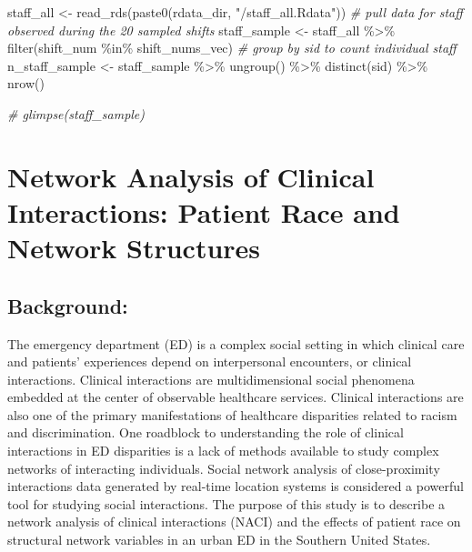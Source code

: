 \documentclass[
]{article}
\newenvironment{Shaded}{\begin{snugshade}}{\end{snugshade}}
\newcommand{\CommentTok}[1]{\textcolor[rgb]{0.56,0.35,0.01}{\textit{#1}}}
\newcommand{\FunctionTok}[1]{\textcolor[rgb]{0.00,0.00,0.00}{#1}}
\newcommand{\NormalTok}[1]{#1}
\newcommand{\OtherTok}[1]{\textcolor[rgb]{0.56,0.35,0.01}{#1}}
\newcommand{\SpecialCharTok}[1]{\textcolor[rgb]{0.00,0.00,0.00}{#1}}
\newcommand{\StringTok}[1]{\textcolor[rgb]{0.31,0.60,0.02}{#1}}
\begin{document}
\begin{Shaded}
\begin{Highlighting}[]
\NormalTok{staff\_all }\OtherTok{\textless{}{-}} \FunctionTok{read\_rds}\NormalTok{(}\FunctionTok{paste0}\NormalTok{(rdata\_dir, }\StringTok{"/staff\_all.Rdata"}\NormalTok{))}
\CommentTok{\# pull data for staff observed during the 20 sampled shifts}
\NormalTok{staff\_sample }\OtherTok{\textless{}{-}}\NormalTok{ staff\_all }\SpecialCharTok{\%\textgreater{}\%} 
  \FunctionTok{filter}\NormalTok{(shift\_num }\SpecialCharTok{\%in\%}\NormalTok{ shift\_nums\_vec)}
\CommentTok{\# group by sid to count individual staff}
\NormalTok{n\_staff\_sample }\OtherTok{\textless{}{-}}\NormalTok{ staff\_sample }\SpecialCharTok{\%\textgreater{}\%} 
  \FunctionTok{ungroup}\NormalTok{() }\SpecialCharTok{\%\textgreater{}\%} 
  \FunctionTok{distinct}\NormalTok{(sid) }\SpecialCharTok{\%\textgreater{}\%} 
  \FunctionTok{nrow}\NormalTok{()}

\CommentTok{\# glimpse(staff\_sample)}
\end{Highlighting}
\end{Shaded}

\hypertarget{network-analysis-of-clinical-interactions-patient-race-and-network-structures}{%
\section{Network Analysis of Clinical Interactions: Patient Race and
Network
Structures}\label{network-analysis-of-clinical-interactions-patient-race-and-network-structures}}

\hypertarget{background}{%
\subsection{Background:}\label{background}}

The emergency department (ED) is a complex social setting in which
clinical care and patients' experiences depend on interpersonal
encounters, or clinical interactions. Clinical interactions are
multidimensional social phenomena embedded at the center of observable
healthcare services. Clinical interactions are also one of the primary
manifestations of healthcare disparities related to racism and
discrimination. One roadblock to understanding the role of clinical
interactions in ED disparities is a lack of methods available to study
complex networks of interacting individuals. Social network analysis of
close-proximity interactions data generated by real-time location
systems is considered a powerful tool for studying social interactions.
The purpose of this study is to describe a network analysis of clinical
interactions (NACI) and the effects of patient race on structural
network variables in an urban ED in the Southern United States.
\end{document}
